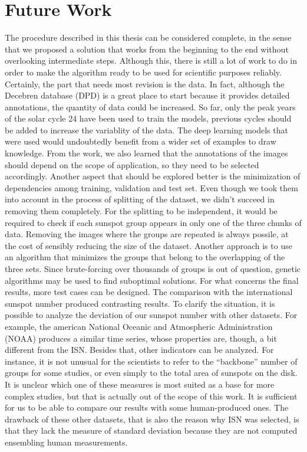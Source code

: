 \section{Future Work}
The procedure described in this thesis can be considered complete, in the sense that we proposed a solution that works from the beginning to the end without overlooking intermediate steps. Although this, there is still a lot of work to do in order to make the algorithm ready to be used for scientific purposes reliably.
\bigbreak
\noindent Certainly, the part that needs most revision is the data. In fact, although the Decebren database (DPD) is a great place to start because it provides detailed annotations, the quantity of data could be increased. So far, only the peak years of the solar cycle 24 have been used to train the models, previous cycles should be added to increase the variablity of the data. The deep learning models that were used would undoubtedly benefit from a wider set of examples to draw knowledge. From the work, we also learned that the annotations of the images should depend on the scope of application, so they need to be selected accordingly.
\bigbreak
\noindent Another aspect that should be explored better is the minimization of dependencies among training, validation and test set. Even though we took them into account in the process of splitting of the dataset, we didn't succeed in removing them completely. For the splitting to be independent, it would be required to check if each sunspot group appears in only one of the three chunks of data. Removing the images where the groups are repeated is always possile, at the cost of sensibly reducing the size of the dataset. Another approach is to use an algorithm that minimizes the groups that belong to the overlapping of the three sets. Since brute-forcing over thousands of groups is out of question, genetic algorithms may be used to find suboptimal solutions.
\bigbreak
\noindent For what concerns the final results, more test cases can be designed. The comparison with the international sunspot number produced contrasting results. To clarify the situation, it is possible to analyze the deviation of our sunspot number with other datasets. For example, the american National Oceanic and Atmospheric Administration (NOAA) produces a similar time series, whose properties are, though, a bit different from the ISN. Besides that, other indicators can be analyzed. For instance, it is not unusual for the scientists to refer to the ``backbone'' number of groups for some studies, or even simply to the total area of sunspots on the disk. It is unclear which one of these measures is most suited as a base for more complex studies, but that is actually out of the scope of this work. It is sufficient for us to be able to compare our results with some human-produced ones. The drawback of these other datasets, that is also the reason why ISN was selected, is that they lack the measure of standard deviation because they are not computed ensembling human measurements.
